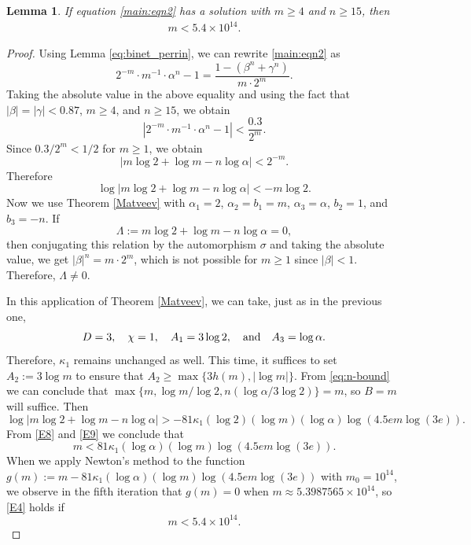 \documentclass[11pt,a4paper]{article}
\newtheorem{lemma}[theorem]{Lemma}
\numberwithin{equation}{section}
\numberwithin{table}{section}
\numberwithin{figure}{section}
\begin{document}
\begin{lemma}\label{lem:R1}
	If equation \eqref{main:eqn2} has a solution with $m\ge 4$ and $n\ge 15$, then
	\begin{align*}
		m <   5.4\times 10^{14}.
	\end{align*}
\end{lemma}
\begin{proof}
Using Lemma \ref{eq:binet_perrin}, we can rewrite \eqref{main:eqn2} as
$$
2^{-m}\cdot m^{-1}\cdot \alpha^{n}-1=\frac{1-(\beta^{n}+\gamma^{n})}{m\cdot 2^{m}}.
$$
Taking the absolute value in the above equality and using the fact that $|\beta|=|\gamma|<0.87$, $m\ge 4$, and $n\ge 15$, we obtain
$$
|2^{-m}\cdot m^{-1}\cdot \alpha^{n}-1|<\frac{0.3}{2^{m}}.
$$ 
Since $0.3/2^{m}<1/2$ for $m\ge 1$, we obtain
\begin{equation*}
|m\log 2+\log m-n\log \alpha|<2^{-m}.
\end{equation*}
Therefore
\begin{equation}\label{E8}
\log |m\log 2+\log m-n\log \alpha|<-m\log 2.
\end{equation}
Now we use Theorem \ref{Matveev} with $\alpha_{1}=2$, $\alpha_{2}=b_{1}=m$, $\alpha_{3}=\alpha$, $b_{2}=1$, and $b_{3}=-n$. If 
$$
\Lambda :=m\log 2+\log m-n\log \alpha=0,
$$ 
then conjugating this relation by the automorphism $\sigma$ and taking the absolute value, we get $|\beta|^{n}=m\cdot 2^{m}$, which is not possible for $m\ge 1$ since $|\beta|<1$. Therefore, $\Lambda \neq 0$. 

In this application of Theorem \ref{Matveev}, we can take, just as in the previous one, 
$$
D=3,\quad \chi =1,\quad A_{1}=3\log 2,\quad {\text{\rm  and}}\quad A_{3}=\log \alpha.
$$ 
Therefore, $\kappa_{1}$ remains unchanged as well. This time, it suffices to set $A_{2}:=3\log m$ to ensure that $A_{2}\ge \max \{3h(m),|\log m|\}$. From \eqref{eq:n-bound} we can conclude that $\max \{m,\log m/\log 2,n(\log \alpha/3\log 2)\}=m$, so $B=m$ will suffice. Then
\begin{equation}\label{E9}
\log |m\log 2+\log m-n\log \alpha|>-81\kappa_{1}(\log 2)(\log m)(\log \alpha)\log (4.5em\log (3e)).
\end{equation}
From \eqref{E8} and \eqref{E9} we conclude that
\begin{equation}\label{E4}
m<81\kappa_{1}(\log \alpha)(\log m)\log (4.5em\log (3e)).
\end{equation}
When we apply Newton's method to the function $g(m):= m-81\kappa_{1}(\log \alpha)(\log m)\log (4.5em\log (3e))$ with $m_{0}=10^{14}$, we observe in the fifth iteration that $g(m)=0$ when $m\approx 5.3987565\times 10^{14}$, so \eqref{E4} holds if
$$
m<5.4\times 10^{14}.
$$
\end{proof}
\end{document}
